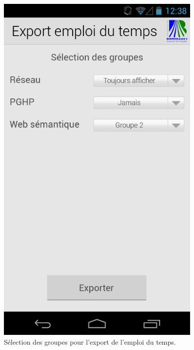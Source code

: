 \documentclass [pdftex,12pt] {report}
\begin{document}
\begin{figure}
\begin{minipage}[t]{8cm}
    \includegraphics[width=0.9\textwidth]{resources/ui_preview/08}
    \caption{Sélection des groupes pour l'export de l'emploi du temps.}
    \label{fig:08}
  \end{minipage}
\end{figure}
\end{document}
